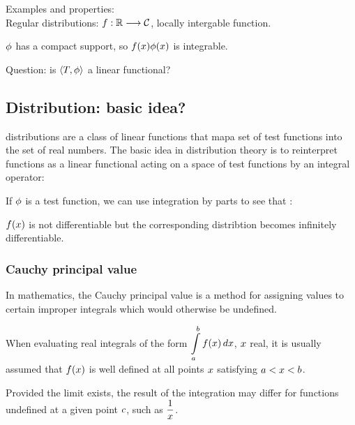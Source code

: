 \documentclass[11pt, openright]{book}
\begin{document}
\begin{dent}{Examples and properties:} \\
    Regular distributions:
    $f: \mathbb{R} \longrightarrow \mathcal{C}$, locally intergable function.

    $\displaystyle{\phi}$ has a compact support, so $\displaystyle{f(x)\phi(x)}$ is integrable.

    Question: is $\displaystyle{\left< T,\phi \right> }$ a linear functional?



\end{dent}

\subsection{Distribution: basic idea?}

distributions are a class of linear functions that mapa set of test functions into the set of real numbers. The basic idea in distribution theory is to reinterpret functions as a linear functional acting on a space of test functions by an integral operator:

If $\displaystyle{\phi}$ is a test function, we can use integration by parts to see that :

$\displaystyle{f(x)}$ is not differentiable but the corresponding distribtion becomes infinitely differentiable.


\subsubsection{Cauchy principal value}

In mathematics, the Cauchy principal value is a method for assigning values to certain improper integrals which would otherwise be undefined.

When evaluating real integrals of the form $\displaystyle{\int\limits_{a}^{b}f(x)  \,d x }$, $\displaystyle{x}$ real, it is usually assumed that $\displaystyle{f(x)}$ is well defined at all points $\displaystyle{x}$ satisfying $\displaystyle{a<x<b}$.

Provided the limit exists, the result of the integration may differ for functions undefined at a given point $\displaystyle{c}$, such as $\displaystyle{\frac{1}{x}}$.
\end{document}
